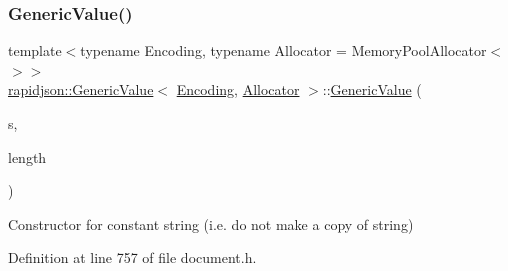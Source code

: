 \subsubsection{\texorpdfstring{GenericValue()}{GenericValue()}\hspace{0.1cm}{\footnotesize\ttfamily [12/17]}}
{\footnotesize\ttfamily template$<$typename Encoding, typename Allocator = Memory\+Pool\+Allocator$<$$>$$>$ \\
\mbox{\hyperlink{classrapidjson_1_1_generic_value}{rapidjson\+::\+Generic\+Value}}$<$ \mbox{\hyperlink{classrapidjson_1_1_encoding}{Encoding}}, \mbox{\hyperlink{classrapidjson_1_1_allocator}{Allocator}} $>$\+::\mbox{\hyperlink{classrapidjson_1_1_generic_value}{Generic\+Value}} (\begin{DoxyParamCaption}\item[{const \mbox{\hyperlink{classrapidjson_1_1_generic_value_adcdbc7fa85a9a41b78966d7e0dcc2ac4}{Ch}} $\ast$}]{s,  }\item[{\mbox{\hyperlink{namespacerapidjson_a44eb33eaa523e36d466b1ced64b85c84}{Size\+Type}}}]{length }\end{DoxyParamCaption})}



Constructor for constant string (i.\+e. do not make a copy of string) 



Definition at line 757 of file document.\+h.


\begin{DoxyCode}{0}

\end{DoxyCode}
\mbox{\label{classrapidjson_1_1_generic_value_a65bfc3073fa80ee5eba8e985abe2f941}} 
